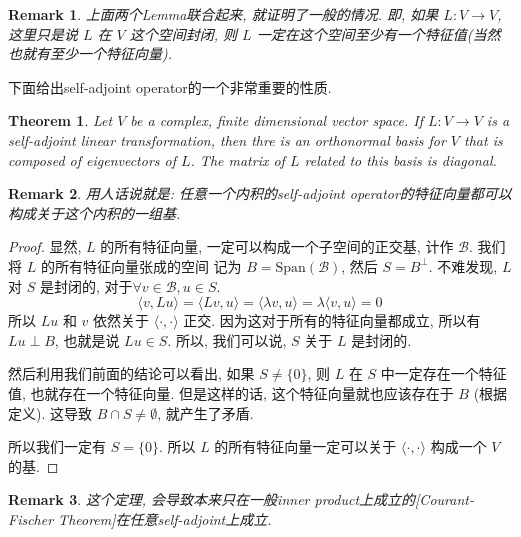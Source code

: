 \documentclass{article}
\newtheorem{theorem}{Theorem}
\newtheorem{remark}{Remark}
\def\<{\langle}
\def\>{\rangle}
\begin{document}
\begin{remark}
  上面两个Lemma联合起来, 就证明了一般的情况.
  即, 如果 $L: V\to V$, 这里只是说 $L$ 在 $V$ 这个空间封闭, 则 $L$ 一定在这个空间至少有一个特征值(当然也就有至少一个特征向量).
\end{remark}
下面给出self-adjoint operator的一个非常重要的性质.
\begin{theorem}
  Let $V$ be a complex, finite dimensional vector space.
  If $L: V\to V$ is a self-adjoint linear transformation, then thre is an orthonormal basis for $V$ that is composed of eigenvectors of $L$.
  The matrix of $L$ related to this basis is diagonal.
\end{theorem}
\begin{remark}
  用人话说就是: 任意一个内积的self-adjoint operator的特征向量都可以构成关于这个内积的一组基.
\end{remark}
\begin{proof}
  显然, $L$ 的所有特征向量, 一定可以构成一个子空间的正交基, 计作 $\mathcal{B}$.
  我们将 $L$ 的所有特征向量张成的空间 记为 $B = \mathrm{Span}(\mathcal{B})$, 然后 $S = B^\perp$.
  不难发现, $L$ 对 $S$ 是封闭的, 对于$\forall v\in \mathcal{B}, u\in S$.
  \[\<v, Lu\> = \<Lv, u\> = \<\lambda v, u\> = \lambda\<v, u\> = 0\]
  所以 $Lu$ 和 $v$ 依然关于 $\<\cdot, \cdot\>$ 正交.
  因为这对于所有的特征向量都成立, 所以有 $Lu \perp B$, 也就是说  $Lu \in S$.
  所以, 我们可以说, $S$ 关于 $L$ 是封闭的.

  然后利用我们前面的结论可以看出, 如果 $S \not=\{0\}$, 则 $L$ 在 $S$ 中一定存在一个特征值, 也就存在一个特征向量. 但是这样的话, 这个特征向量就也应该存在于 $B$ (根据定义). 这导致 $B \cap S \not = \emptyset$, 就产生了矛盾.

  所以我们一定有 $S = \{0\}$.
  所以 $L$ 的所有特征向量一定可以关于 $\<\cdot, \cdot\>$ 构成一个 $V$ 的基.
\end{proof}
\begin{remark}
  这个定理, 会导致本来只在一般inner product上成立的[Courant-Fischer Theorem]在任意self-adjoint上成立.
\end{remark}
\end{document}
